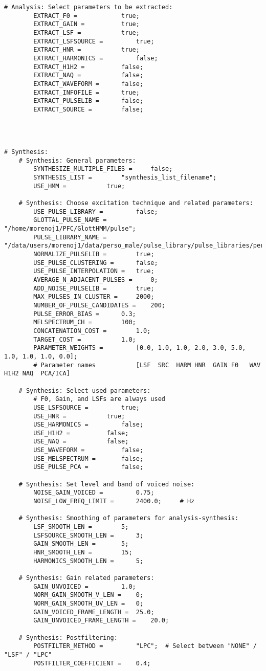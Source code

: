 \begin{lstlisting}[caption = Configuration file]
	# Analysis: Select parameters to be extracted:
		EXTRACT_F0 = 			true;
		EXTRACT_GAIN = 			true;
		EXTRACT_LSF = 			true;
		EXTRACT_LSFSOURCE =     	true;
		EXTRACT_HNR = 			true;
		EXTRACT_HARMONICS = 		false;
		EXTRACT_H1H2 = 			false;
		EXTRACT_NAQ = 			false;
		EXTRACT_WAVEFORM = 		false;
		EXTRACT_INFOFILE =		true;
		EXTRACT_PULSELIB = 		false;
		EXTRACT_SOURCE = 		false;




# Synthesis:
	# Synthesis: General parameters:
		SYNTHESIZE_MULTIPLE_FILES = 	false;
		SYNTHESIS_LIST = 		"synthesis_list_filename";
		USE_HMM = 			true;

	# Synthesis: Choose excitation technique and related parameters:
		USE_PULSE_LIBRARY = 		false;
		GLOTTAL_PULSE_NAME = 		"/home/morenoj1/PFC/GlottHMM/pulse";
		PULSE_LIBRARY_NAME = 		"/data/users/morenoj1/data/perso_male/pulse_library/pulse_libraries/perso_male_lib/perso_male_lib";
		NORMALIZE_PULSELIB = 		true;
		USE_PULSE_CLUSTERING = 		false;
		USE_PULSE_INTERPOLATION = 	true;
		AVERAGE_N_ADJACENT_PULSES = 	0;
		ADD_NOISE_PULSELIB = 		true;
		MAX_PULSES_IN_CLUSTER = 	2000;
		NUMBER_OF_PULSE_CANDIDATES = 	200;
		PULSE_ERROR_BIAS = 		0.3;
		MELSPECTRUM_CH = 		100;
		CONCATENATION_COST = 		1.0;
		TARGET_COST = 			1.0;
		PARAMETER_WEIGHTS = 		[0.0, 1.0, 1.0, 2.0, 3.0, 5.0, 1.0, 1.0, 1.0, 0.0];
		# Parameter names   		[LSF  SRC  HARM HNR  GAIN F0   WAV  H1H2 NAQ  PCA/ICA]

	# Synthesis: Select used parameters:
		# F0, Gain, and LSFs are always used
		USE_LSFSOURCE = 		true;
		USE_HNR = 			true;
		USE_HARMONICS = 		false;
		USE_H1H2 = 			false;
		USE_NAQ = 			false;
		USE_WAVEFORM = 			false;
		USE_MELSPECTRUM =		false;
		USE_PULSE_PCA = 		false;

	# Synthesis: Set level and band of voiced noise:
		NOISE_GAIN_VOICED = 		0.75;
		NOISE_LOW_FREQ_LIMIT = 		2400.0;		# Hz

	# Synthesis: Smoothing of parameters for analysis-synthesis:
		LSF_SMOOTH_LEN = 		5;
		LSFSOURCE_SMOOTH_LEN = 		3;
		GAIN_SMOOTH_LEN = 		5;
		HNR_SMOOTH_LEN = 		15;
		HARMONICS_SMOOTH_LEN = 		5;

	# Synthesis: Gain related parameters:
		GAIN_UNVOICED = 		1.0;
		NORM_GAIN_SMOOTH_V_LEN = 	0;
		NORM_GAIN_SMOOTH_UV_LEN = 	0;
		GAIN_VOICED_FRAME_LENGTH = 	25.0;
		GAIN_UNVOICED_FRAME_LENGTH = 	20.0;

	# Synthesis: Postfiltering:
		POSTFILTER_METHOD = 		"LPC";	# Select between "NONE" / "LSF" / "LPC"
		POSTFILTER_COEFFICIENT = 	0.4;


\end{lstlisting}
